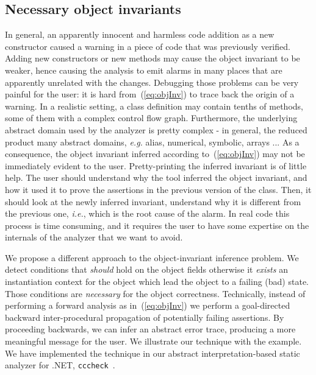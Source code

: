 \documentclass{llncs}
\newcommand{\refEq}[1]{(\ref{eq:#1})}
\newcommand{\cccheck}{\texttt{cccheck}}
\begin{document}
\subsection{Necessary object invariants}
In general, an apparently innocent and harmless code addition as a new constructor caused a warning in a piece of code that was previously verified.
Adding new constructors or  new methods may cause the object invariant to be weaker, hence causing the analysis to emit alarms in many places that are apparently unrelated with the changes.
Debugging those problems can be very painful for the user: it is hard from~\refEq{objInv} to trace back the origin of a warning.
In a  realistic setting, a class definition may contain tenths of methods, some of them with a complex control flow graph.
Furthermore, the underlying abstract domain used by the analyzer is pretty complex - in general, the reduced product many abstract domains, \emph{e.g.} alias, numerical, symbolic, arrays ...
As a consequence, the object invariant inferred according to~\refEq{objInv}  may not be immediately evident to the user.
Pretty-printing the inferred invariant is of little help.
The user should understand why the tool inferred the object invariant, and how it used it to prove the assertions in the previous version of the class.
Then, it should look at the newly inferred invariant, understand why it is different from the previous one, \emph{i.e.}, which is the root cause of  the alarm.
In real code this process is time consuming, and it requires the user to have some expertise on the internals of the analyzer that we want to avoid.

We propose a different approach to the object-invariant inference problem.
We detect conditions that \emph{should} hold on the object fields otherwise it \emph{exists} an instantiation context for the object which lead the object to a failing (bad) state. 
Those conditions are \emph{necessary} for the object correctness. 
Technically, instead of performing a forward analysis as in~\refEq{objInv} we perform a goal-directed backward inter-procedural propagation of potentially failing assertions.
By proceeding backwards, we can infer an abstract error trace, producing a more meaningful message for the user.
We illustrate our technique with the   example.
We have implemented the technique in our abstract interpretation-based static analyzer for .NET, \cccheck~\cite{FahndrichLogozzo10}.
\end{document}

